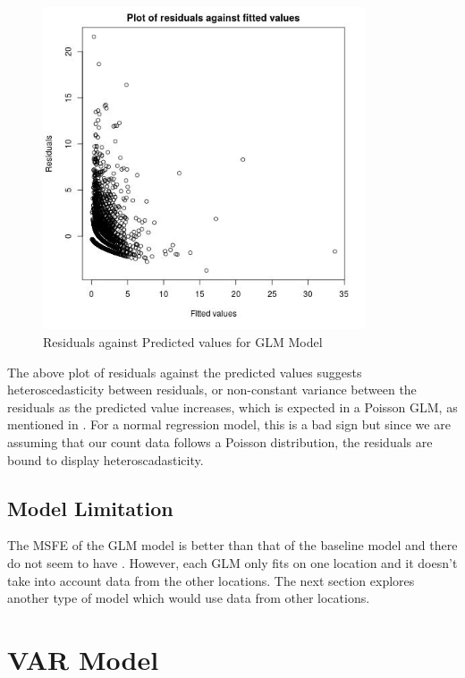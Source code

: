 \documentclass[12pt, letterpaper] {article}
\begin{document}
\begin{figure}[H]
    \centering
    \includegraphics[width=0.85\textwidth, height=0.6\textheight]{Images/Full_GLM_resids_vs_fitted.jpg}
    \caption{Residuals against Predicted values for GLM Model}
    \label{fig:Residuals against Predicted values for GLM Model}
\end{figure}

\noindent The above plot of residuals against the predicted values suggests heteroscedasticity between residuals, or non-constant variance between the residuals as the predicted value increases, which is expected in a Poisson GLM, as mentioned in \cite{Dylan2017}. For a normal regression model, this is a bad sign but since we are assuming that our count data follows a Poisson distribution, the residuals are bound to display heteroscadasticity. 

\subsection{Model Limitation}

The MSFE of the GLM model is better than that of the baseline model and there do not seem to have . However, each GLM only fits on one location and it doesn't take into account data from the other locations. The next section explores another type of model which would use data from other locations. 

\section{VAR Model}
\end{document}
